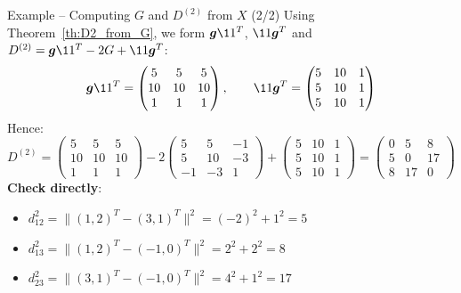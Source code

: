\documentclass[aspectratio=169]{beamer}\usepackage[]{graphicx}\usepackage[]{xcolor}
\begin{document}
\begin{frame}{Example -- Computing $G$ and $D^{(2)}$ from $X$ (2/2)}
Using Theorem~\ref{th:D2_from_G}, we form $\bg\11^T$, $\11\bg^T$ and $D^{(2)} = \bg\11^T - 2G + \11\bg^T$:
\[
\bg\11^T = \begin{pmatrix}
5 & 5 & 5 \\
10 & 10 & 10 \\
1 & 1 & 1
\end{pmatrix}, \qquad
\11\bg^T = \begin{pmatrix}
5 & 10 & 1 \\
5 & 10 & 1 \\
5 & 10 & 1
\end{pmatrix}
\]
\vfill
Hence:
\[
D^{(2)} = \begin{pmatrix}
5 & 5 & 5 \\
10 & 10 & 10 \\
1 & 1 & 1
\end{pmatrix}
- 2\begin{pmatrix}
5 & 5 & -1 \\
5 & 10 & -3 \\
-1 & -3 & 1
\end{pmatrix}
+ \begin{pmatrix}
5 & 10 & 1 \\
5 & 10 & 1 \\
5 & 10 & 1
\end{pmatrix}
= \begin{pmatrix}
0 & 5 & 8 \\
5 & 0 & 17 \\
8 & 17 & 0
\end{pmatrix}
\]
\vfill
\textbf{Check directly}:
\begin{itemize}
\item $d_{12}^2 = \|(1,2)^T - (3,1)^T\|^2 = (-2)^2 + 1^2 = 5$
\item $d_{13}^2 = \|(1,2)^T - (-1,0)^T\|^2 = 2^2 + 2^2 = 8$
\item $d_{23}^2 = \|(3,1)^T - (-1,0)^T\|^2 = 4^2 + 1^2 = 17$
\end{itemize}
\end{frame}


\end{document}
